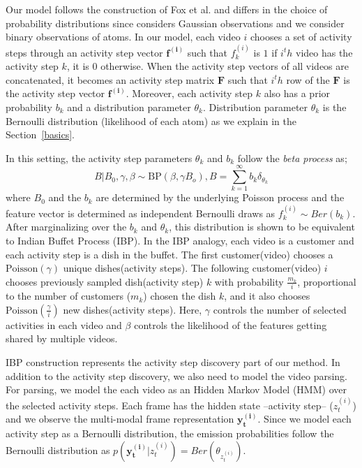 Our model follows the construction of Fox et al.\cite{foxBPHMM} and differs in the choice of probability distributions since \cite{foxBPHMM} considers Gaussian observations and we consider binary observations of atoms. In our model, each video $i$ chooses a set of activity steps through an activity step vector $\mathbf{f^{(i)}}$ such that $f^{(i)}_k$ is $1$ if $i^th$ video has the activity step $k$, it is 0 otherwise. When the activity step vectors of all videos are concatenated, it becomes an activity step matrix $\mathbf{F}$ such that $i^th$ row of the $\mathbf{F}$ is the activity step vector $\mathbf{f^{(i)}}$. Moreover, each activity step $k$ also has a prior probability $b_k$  and a distribution parameter $\theta_k$. Distribution parameter $\theta_k$ is the Bernoulli distribution (\ie likelihood of each atom) as we explain in the Section~\ref{basics}. 

In this setting, the activity step parameters $\theta_k$ and $b_k$ follow the \emph{beta process} as;
\begin{equation}
  B|B_0,\gamma,\beta \sim \text{BP}(\beta,\gamma B_o), B=\sum_{k=1}^\infty b_k \delta_{\theta_k}
\end{equation}
where $B_0$ and the $b_k$ are determined by the underlying Poisson process \cite{ibp} and the feature vector is determined as independent Bernoulli draws as $f_{k}^{(i)} \sim Ber(b_k)$. After marginalizing over the $b_k$ and $\theta_k$, this distribution is shown to be equivalent to Indian Buffet Process (IBP)\cite{ibp}. In the IBP analogy, each video is a customer and each activity step is a dish in the buffet. The first customer(video) chooses a $\text{Poisson}(\gamma)$ unique dishes(activity steps). The following customer(video) $i$ chooses previously sampled dish(activity step) $k$ with probability $\frac{m_k}{i}$,  proportional to the number of customers ($m_k$) chosen the dish $k$, and it also chooses $\text{Poisson}(\frac{\gamma}{i})$ new dishes(activity steps). Here, $\gamma$ controls the number of selected activities in each video and $\beta$ controls the likelihood of the features getting shared by multiple videos.

IBP construction represents the activity step discovery part of our method. In addition to the activity step discovery, we also need to model the video parsing. For parsing, we model the each video as an Hidden Markov Model (HMM) over the selected activity steps. Each frame has the hidden state --activity step-- ($z^{(i)}_t$) and we observe the multi-modal frame representation $\mathbf{y^{(i)}_t}$. Since we model each activity step as a Bernoulli distribution, the emission probabilities follow the Bernoulli distribution as $p(\mathbf{y^{(i)}_t}|z^{(i)}_t)=Ber(\theta_{z^{(i)}_t})$.

